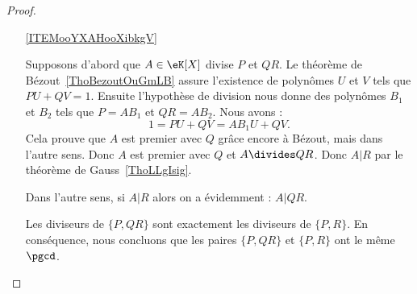 \begin{proof}
\begin{enumerate}

		\item[\ref{ITEMooYXAHooXibkgV}]

		      Supposons d'abord que \( A\in \eK[X]\) divise \( P\) et \( QR\). Le théorème de Bézout~\ref{ThoBezoutOuGmLB} assure l'existence de polynômes $U$ et $V$ tels que $PU+QV=1$. Ensuite l'hypothèse de division nous donne des polynômes \( B_1\) et \( B_2\) tels que $P=AB_1$ et $QR=AB_2$.  Nous avons :
		      \begin{equation}
			      1=PU+QV=AB_1U+QV.
		      \end{equation}
		      Cela prouve que \( A\) est premier avec $Q$ grâce encore à Bézout, mais dans l'autre sens. Donc \( A\) est premier avec \( Q\) et \( A\divides QR\). Donc \( A|R\) par le théorème de Gauss~\ref{ThoLLgIsig}.

		      Dans l'autre sens, si $A|R$ alors on a évidemment : $A|QR$.

		      Les diviseurs de $\{P,QR\}$ sont exactement les diviseurs de $\{P,R\}$. En conséquence, nous concluons que les paires $\{P,QR\}$ et $\{P,R\}$ ont le même $\pgcd$.
	\end{enumerate}
\end{proof}
